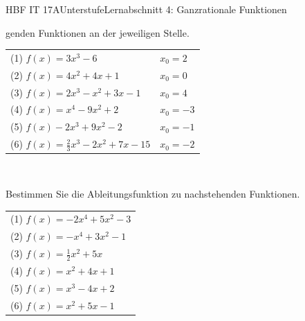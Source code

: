 \documentclass[oneside,openany,headings=optiontotoc,11pt,numbers=noenddot]{scrreprt}
\begin{document}
\begin{worksheet}{HBF IT 17A}{Unterstufe}{Lernabschnitt 4: Ganzrationale Funktionen}
\begin{framed}
genden Funktionen an der jeweiligen Stelle.\\
			\par\noindent
			\begin{tabular}{ll}
				(1) \(f(x) = 3x^3-6\) & \(x_0 = 2\) \\
				(2) \(f(x) = 4x^2 +4x +1\) & \( x_0 = 0\)\\
				(3) \(f(x) = 2x^3-x^2+3x-1\) & \(x_0 = 4\)\\
				(4) \(f(x) = x^4-9x^2+2\) & \(x_0 = -3\)\\
				(5) \(f(x)-2x^3+9x^2-2\) & \(x_0=-1\)\\
				(6) \(f(x) = \frac{2}{3}x^3 -2x^2+7x -15\) & \(x_0=-2\)
			\end{tabular}\\
			\par\bigskip\noindent
			Bestimmen Sie die Ableitungsfunktion zu nachstehenden Funktionen.\\
			\par\noindent
			\begin{tabular}{l}
				(1) \(f(x) = -2x^4+5x^2-3\)\\
				(2) \(f(x) = -x^4+3x^2-1\)\\
				(3) \(f(x) = \frac{1}{2}x^2+5x\)\\
				(4) \(f(x) = x^2 + 4x +1\)\\
				(5) \(f(x) = x^3-4x+2\)\\
				(6) \(f(x) = x^2+5x-1\)
			\end{tabular}
		\end{framed}
	\end{worksheet}
\end{document}
